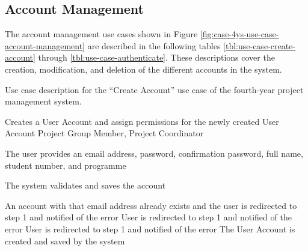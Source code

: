 \documentclass[document.tex]{subfiles}
\begin{document}
\FloatBarrier

\subsection{Account Management}
\label{sec:account-management}

The account management use cases shown in Figure \ref{fig:case-4ys-use-case-account-management} are described in the following tables \ref{tbl:use-case-create-account} through \ref{tbl:use-case-authenticate}. These descriptions cover the creation, modification, and deletion of the different accounts in the system.


\begin{table}
  \centering
  \caption{Use case description for the ``Create Account'' use case of the fourth-year project management system.}
  \label{tbl:use-case-create-account}

  \begin{usecase}
    Creates a User Account and assign permissions for the newly created User Account
    Project Group Member, Project Coordinator
    \ucnormal
    \begin{ucenum}
      \item The user provides an email address, password, confirmation password, full name, student number, and programme
      \item The system validates and saves the account
    \end{ucenum}
    An account with that email address already exists and the user is redirected to step 1 and notified of the error
    User is redirected to step 1 and notified of the error
    User is redirected to step 1 and notified of the error
    The User Account is created and saved by the system
  \end{usecase}
\end{table}
\end{document}

